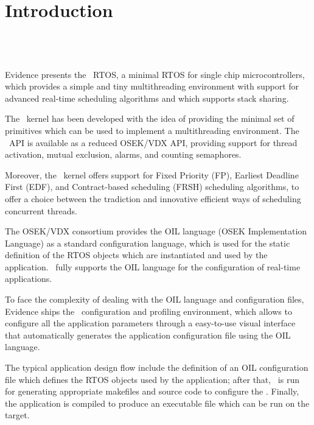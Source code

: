 \chapter{Introduction}

\section{\ee\ }
Evidence presents the \ee\ RTOS, a minimal RTOS for single
chip microcontrollers, which provides a simple and tiny multithreading
environment with support for advanced real-time scheduling algorithms
and which supports stack sharing.

The \ee\ kernel has been developed with the idea of providing the
minimal set of primitives which can be used to implement a
multithreading environment. The \ee\ API is available as a reduced
OSEK/VDX API, providing support for thread activation, mutual
exclusion, alarms, and counting semaphores.

Moreover, the \ee\ kernel offers support for Fixed Priority (FP),
Earliest Deadline First (EDF), and Contract-based scheduling (FRSH)
\cite{frescor} scheduling algorithms, to offer a choice between the
tradiction and innovative efficient ways of scheduling concurrent
threads.

The OSEK/VDX consortium provides the OIL language (OSEK Implementation 
Language) as a standard configuration language, which is used for the 
static definition of the RTOS objects which are instantiated and used 
by the application. \ee\ fully supports the OIL language for the 
configuration of real-time applications.

To face the complexity of dealing with the OIL language and 
configuration files, Evidence ships the \rtd\ configuration and 
profiling environment, which allows to configure all the application 
parameters through a easy-to-use visual interface that automatically 
generates the application configuration file using the OIL language. 

The typical application design flow include the definition of an OIL 
configuration file which defines the RTOS objects used by the 
application; after that, \rtd\ is run for generating appropriate makefiles 
and source code to configure the \ee. Finally, the application is 
compiled to produce an executable file which can be run on the target. 

